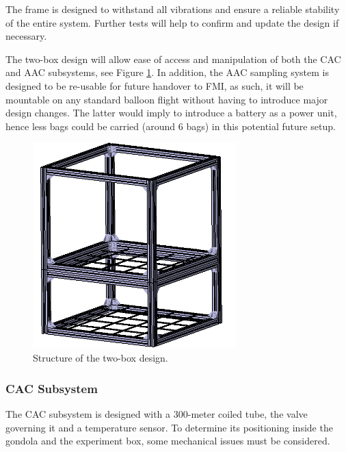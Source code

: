 The frame is designed to withstand all vibrations and ensure a reliable stability of the entire system. Further tests will help to confirm and update the design if necessary. 

The two-box design will allow ease of access and manipulation of both the CAC and AAC subsystems, see Figure \ref{strucutre}. In addition, the AAC sampling system is designed to be re-usable for future handover to FMI, as such, it will be mountable on any standard balloon flight without having to introduce major design changes. The latter would imply to introduce a battery as a power unit, hence less bags could be carried (around 6 bags) in this potential future setup.

\begin{figure}[!ht]
    \centering
    \includegraphics[width=0.7\textwidth, angle=90]{4-experiment-design/img/frame_structure.jpg}
    \caption{Structure of the two-box design.}
    \label{strucutre}
\end{figure}

\subsubsection{CAC Subsystem}

The CAC subsystem is designed with a 300-meter coiled tube, the valve governing it and a temperature sensor. To determine its positioning inside the gondola and the experiment box, some mechanical issues must be considered.

